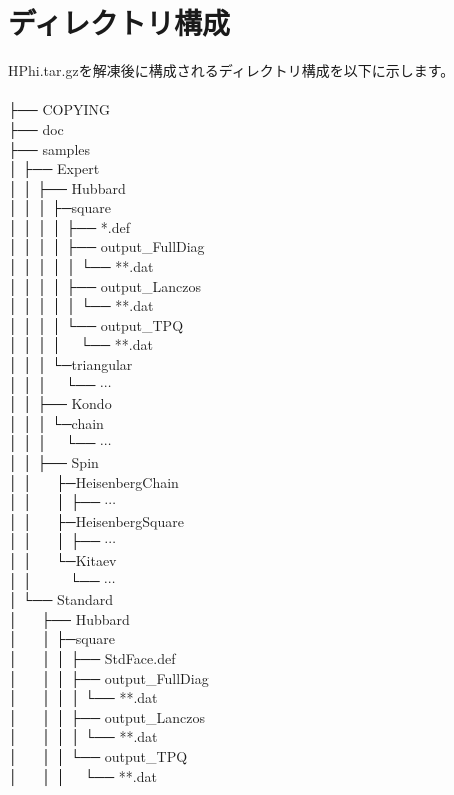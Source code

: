 \section{ディレクトリ構成}
HPhi.tar.gzを解凍後に構成されるディレクトリ構成を以下に示します。\\
\\
├── COPYING\\
├── doc\\
├── samples\\
│  ├── Expert\\
│  │  ├── Hubbard\\
│  │  │  ├─square\\
│  │  │  │  ├── *.def\\
│  │  │  │  ├── output\_FullDiag\\
│  │  │  │  │ └── **.dat\\
│  │  │  │  ├── output\_Lanczos\\
│  │  │  │  │ └── **.dat\\
│  │  │  │  └── output\_TPQ\\
│  │  │  │    ~~└── **.dat\\
│  │  │  └─triangular\\
│  │  │  ~~└── $\cdots$\\
│  │  ├── Kondo\\
│  │  │  └─chain\\
│  │  │  ~~└── $\cdots$\\
│  │  ├── Spin\\
│  │    ~~  ├─HeisenbergChain\\
│  │    ~~  │  ├── $\cdots$\\
│  │    ~~  ├─HeisenbergSquare\\
│  │    ~~  │  ├── $\cdots$\\
│  │    ~~  └─Kitaev\\
│  │    ~~  ~~└── $\cdots$\\
│  └── Standard\\
│  ~~  ├── Hubbard\\
│  ~~  │  ├─square\\
│  ~~  │  │  ├── StdFace.def\\
│  ~~  │  │  ├── output\_FullDiag\\
│  ~~  │  │  │ └── **.dat\\
│  ~~  │  │  ├── output\_Lanczos\\
│  ~~  │  │  │ └── **.dat\\
│  ~~  │  │  └── output\_TPQ\\
│  ~~  │  │    ~~└── **.dat\\
